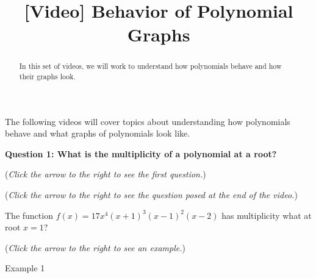 \documentclass{ximera}
\title[Prerequisite Videos: ]{[Video] Behavior of Polynomial Graphs}
\begin{document}
\begin{abstract}
   In this set of videos, we will work to understand how 
   polynomials behave and how their graphs look.  
\end{abstract}
\maketitle


The following videos will cover topics about understanding how polynomials behave and what graphs of polynomials look like.

\textbf{Question 1: What is the multiplicity of a polynomial at a root?}
\begin{question}
\begin{flushright}
{\color{blue}(\emph{Click the arrow to the right to see the first question.})}
\end{flushright}
\begin{center}
\begin{expandable}
{\color{blue}(\emph{Click the arrow to the right to see the question
posed at the end of the video.})}
\begin{expandable}
The function $f(x) = 17x^4(x+1)^3(x-1)^2(x-2)$ has multiplicity what at root $x=1$?
\begin{multipleChoice}
\end{multipleChoice}
\begin{flushright}
{\color{blue}(\emph{Click the arrow to the right to see an example.})}
\end{flushright}
\begin{expandable}
Example 1
\end{expandable}
\end{expandable}
\end{expandable}
\end{center}
\end{question}
\end{document}
